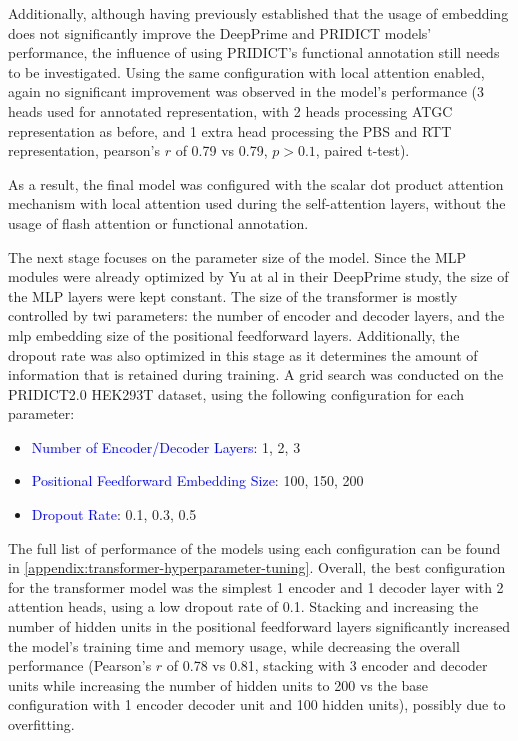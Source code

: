 Additionally, although having previously established that the usage of embedding does not significantly improve the DeepPrime and PRIDICT models' performance, the influence of using PRIDICT's functional annotation still needs to be investigated. Using the same configuration with local attention enabled, again no significant improvement was observed in the model's performance (3 heads used for annotated representation, with 2 heads processing ATGC representation as before, and 1 extra head processing the PBS and RTT representation, pearson's $r$ of 0.79 vs 0.79, $p>0.1$, paired t-test).

As a result, the final model was configured with the scalar dot product attention mechanism with local attention used during the self-attention layers, without the usage of flash attention or functional annotation.

The next stage focuses on the parameter size of the model. Since the MLP modules were already optimized by Yu at al in their DeepPrime study, the size of the MLP layers were kept constant. The size of the transformer is mostly controlled by twi parameters: the number of encoder and decoder layers, and the mlp embedding size of the positional feedforward layers. Additionally, the dropout rate was also optimized in this stage as it determines the amount of information that is retained during training. A grid search was conducted on the PRIDICT2.0 HEK293T dataset, using the following configuration for each parameter:

\begin{itemize}[itemsep=-0mm]
    \item \textcolor{blue}{Number of Encoder/Decoder Layers}: 1, 2, 3
    \item \textcolor{blue}{Positional Feedforward Embedding Size}: 100, 150, 200
    \item \textcolor{blue}{Dropout Rate}: 0.1, 0.3, 0.5
\end{itemize}

The full list of performance of the models using each configuration can be found in \autoref{appendix:transformer-hyperparameter-tuning}. Overall, the best configuration for the transformer model was the simplest 1 encoder and 1 decoder layer with 2 attention heads, using a low dropout rate of 0.1. Stacking and increasing the number of hidden units in the positional feedforward layers significantly increased the model's training time and memory usage, while decreasing the overall performance (Pearson's $r$ of 0.78 vs 0.81, stacking with 3 encoder and decoder units while increasing the number of hidden units to 200 vs the base configuration with 1 encoder decoder unit and 100 hidden units), possibly due to overfitting.

